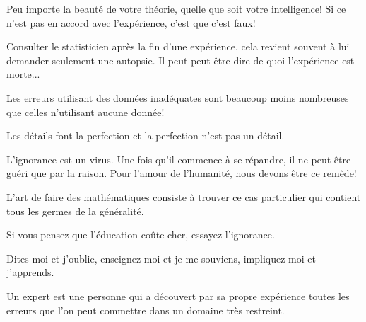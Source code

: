  	\begin{fquote}Peu importe la beauté de votre théorie, quelle que soit votre intelligence! Si ce n'est pas en accord avec l'expérience, c'est que c'est faux!
 	\end{fquote}
 	
 	\begin{fquote}Consulter le statisticien après la fin d’une expérience, cela revient souvent à lui demander seulement une autopsie. Il peut peut-être dire de quoi l’expérience est morte...
 	\end{fquote}
 	
 	\begin{fquote}Les erreurs utilisant des données inadéquates sont beaucoup moins nombreuses que celles n'utilisant aucune donnée!
 	\end{fquote}
 	
 	\begin{fquote}Les détails font la perfection et la perfection n'est pas un détail.
 	\end{fquote}
 	
 	\begin{fquote}L'ignorance est un virus. Une fois qu'il commence à se répandre, il ne peut être guéri que par la raison. Pour l'amour de l'humanité, nous devons être ce remède!
 	\end{fquote}
 	
 	\begin{fquote}L'art de faire des mathématiques consiste à trouver ce cas particulier qui contient tous les germes de la généralité.
 	\end{fquote}

 	\begin{fquote}Si vous pensez que l'éducation coûte cher, essayez l'ignorance.
 	\end{fquote}
 	
 	 \begin{fquote}Dites-moi et j'oublie, enseignez-moi et je me souviens, impliquez-moi et j'apprends.
 	\end{fquote}
 

 	 \begin{fquote}Un expert est une personne qui a découvert par sa propre expérience toutes les erreurs que l'on peut commettre dans un domaine très restreint.
 	\end{fquote}
 	
